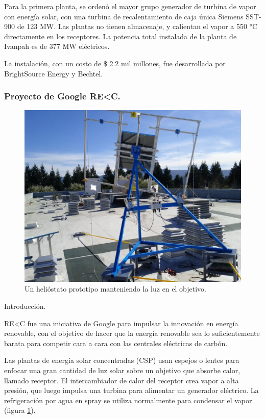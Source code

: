 Para la primera planta, se ordenó el mayor grupo generador de turbina de vapor con energía solar, con una turbina de recalentamiento de caja única Siemens SST-900 de 123 MW. Las plantas no tienen almacenaje, y calientan el vapor a 550 °C directamente en los receptores. La potencia total instalada de la planta de Ivanpah es de 377 MW eléctricos.
 
La instalación, con un costo de \$ 2.2 mil millones, fue desarrollada por BrightSource Energy y Bechtel. \cite{Wikipedia2WebSite}



\subsubsection{Proyecto de Google RE\textless C.}

\begin{figure}[h!]
  	\centering
	\includegraphics[scale=1]{FotosPaginasWebHeliostatos/HeliostatoGoogle.png}
	\caption{Un helióstato prototipo manteniendo la luz en el objetivo.~\cite{Wikipedia3WebSite}
	\label{fig:FotosPaginasWebHeliostatos/HeliostatoGoogle.png}}
\end{figure} 

Introducción.

RE\textless C fue una iniciativa de Google para impulsar la innovación en energía renovable, con el objetivo de hacer que la energía renovable sea lo suficientemente barata para competir cara a cara con las centrales eléctricas de carbón.

Las plantas de energía solar concentradas (CSP) usan espejos o lentes para enfocar una gran cantidad de luz solar sobre un objetivo que absorbe calor, llamado receptor. El intercambiador de calor del receptor crea vapor a alta presión, que luego impulsa una turbina para alimentar un generador eléctrico. La refrigeración por agua en spray se utiliza normalmente para condensar el vapor (figura \ref{fig:FotosPaginasWebHeliostatos/HeliostatoGoogle.png}).

